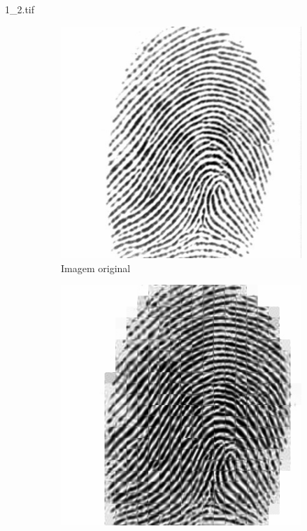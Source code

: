 \documentclass{beamer}
\begin{document}
    \begin{frame}{1\_2.tif}
        \begin{figure}
            \centering
            \begin{subfigure}[!ht]{0.32\textwidth}
                \includegraphics[width=\columnwidth]{Fingerprints/1_2.jpg}
                \caption{Imagem original}
            \end{subfigure}
            \begin{subfigure}[!ht]{0.32\textwidth}
                \includegraphics[width=\columnwidth]{Fingerprints/1_2_intermediate.jpg}

\end{subfigure}
\end{figure}
\end{frame}
\end{document}
